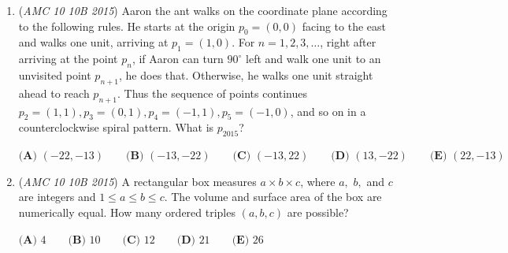 \begin{enumerate}
 $\textbf{(A) }7\qquad\textbf{(B) }8\qquad\textbf{(C) }9\qquad\textbf{(D) }10\qquad\textbf{(E) }11$


	\item (\textit{AMC 10 10B 2015}) Aaron the ant walks on the coordinate plane according to the following rules. He starts at the origin $p_0=(0,0)$ facing to the east and walks one unit, arriving at $p_1=(1,0)$. For $n=1,2,3,\dots$, right after arriving at the point $p_n$, if Aaron can turn $90^\circ$ left and walk one unit to an unvisited point $p_{n+1}$, he does that. Otherwise, he walks one unit straight ahead to reach $p_{n+1}$. Thus the sequence of points continues $p_2=(1,1), p_3=(0,1), p_4=(-1,1), p_5=(-1,0)$, and so on in a counterclockwise spiral pattern. What is $p_{2015}$?


 $\textbf{(A) } (-22,-13)\qquad\textbf{(B) } (-13,-22)\qquad\textbf{(C) } (-13,22)\qquad\textbf{(D) } (13,-22)\qquad\textbf{(E) } (22,-13)$


	\item (\textit{AMC 10 10B 2015}) A rectangular box measures $a \times b \times c$, where $a,$ $b,$ and $c$ are integers and $1 \leq a \leq b \leq c$. The volume and surface area of the box are numerically equal. How many ordered triples $(a,b,c)$ are possible?


 $\textbf{(A) }4\qquad\textbf{(B) }10\qquad\textbf{(C) }12\qquad\textbf{(D) }21\qquad\textbf{(E) }26$


\end{enumerate}